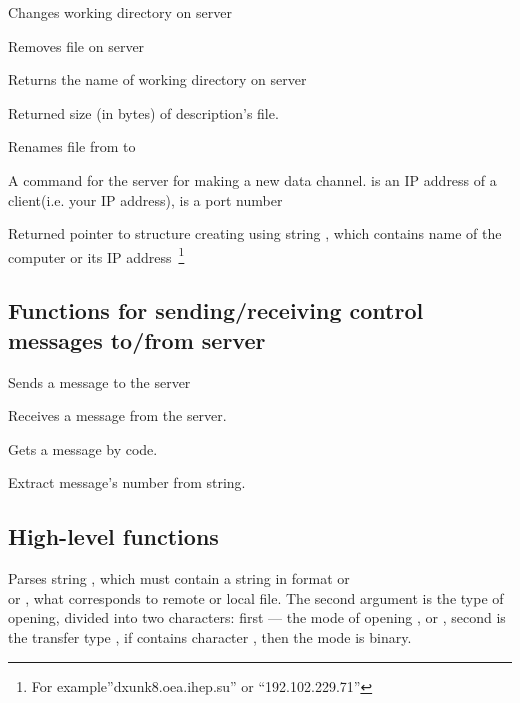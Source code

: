 {Changes working directory on server}

{Removes file on server}

{Returns the name of working directory on server}

{Returned size (in bytes) of description's file.}

{Renames file from  to }

{ A command for the server for making a new data channel.  is an IP address of a client(i.e. your IP address), 
 is a port number}


{Returned pointer to structure  creating using string 
, which contains name of the computer or its IP 
address~\footnote{For example''dxunk8.oea.ihep.su'' or ``192.102.229.71''} 
}  


\subsection{Functions for sending/receiving control messages to/from server}

{Sends a message to the server}

{Receives a message from the server.}

{Gets a message by code.}

{Extract message's number from string.}

\subsection{High-level functions}

{  
Parses string , which must contain a string in format or \\
 or ,
what corresponds to remote or local file. The second argument is the type of opening, divided into two characters: 
first --- the mode of opening ,  or , second is the transfer type , if contains character ,
 then the mode is binary.
}

